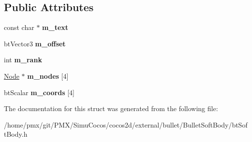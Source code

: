 \subsection*{Public Attributes}
\begin{DoxyCompactItemize}
\item 
\mbox{\label{structbtSoftBody_1_1Note_adfb1568162e3a01e73c226e1727c7468}} 
const char $\ast$ {\bfseries m\+\_\+text}
\item 
\mbox{\label{structbtSoftBody_1_1Note_a8fec523bbe4d172e0e783ed7a9bd3a7e}} 
bt\+Vector3 {\bfseries m\+\_\+offset}
\item 
\mbox{\label{structbtSoftBody_1_1Note_aa01e3e06ddf3ed1539b501fec0d25332}} 
int {\bfseries m\+\_\+rank}
\item 
\mbox{\label{structbtSoftBody_1_1Note_aca99ac080d4282d94667fd9d527914c2}} 
\hyperlink{structbtSoftBody_1_1Node}{Node} $\ast$ {\bfseries m\+\_\+nodes} \mbox{[}4\mbox{]}
\item 
\mbox{\label{structbtSoftBody_1_1Note_a68226826ba138cc3ecb6968857821726}} 
bt\+Scalar {\bfseries m\+\_\+coords} \mbox{[}4\mbox{]}
\end{DoxyCompactItemize}


The documentation for this struct was generated from the following file\+:\begin{DoxyCompactItemize}
\item 
/home/pmx/git/\+P\+M\+X/\+Simu\+Cocos/cocos2d/external/bullet/\+Bullet\+Soft\+Body/bt\+Soft\+Body.\+h\end{DoxyCompactItemize}
